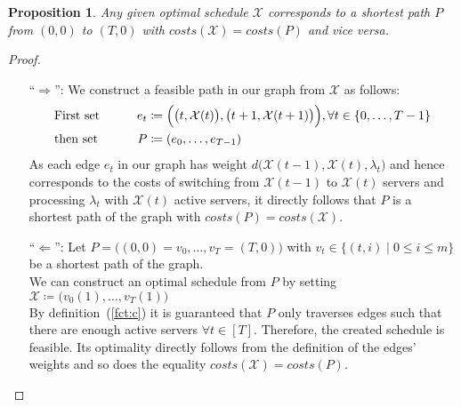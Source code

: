 \documentclass[hidelinks]{article}
\theoremstyle{plain}
\newtheorem{prop}[thm]{Proposition}
\theoremstyle{definition}
\theoremstyle{rem}
\newcommand{\mx}{\mathcal{X}}
\newcommand{\fromto}[2]{\{#1,\ldots,#2\}}
\begin{document}
\begin{sloppypar}
\begin{prop}
	Any given optimal schedule $\mx$ corresponds to a shortest path $P$ from $(0,0)$ to $(T,0)$ with $costs(\mx)=costs(P)$ and vice versa.
\end{prop} 
\begin{proof}
$ $
\begin{itemize}
	\item[``$\Rightarrow$'':] We construct a feasible path in our graph from $\mx$ as follows:
\begin{alignat*}{2}
	&\text{First set}\qquad&e_t&\coloneqq\Bigl(\bigl(t,\mx(t)\bigr),\bigl(t+1,\mx(t+1)\bigr)\Bigr),\forall t\in\fromto{0}{T-1}\\
	&\text{then set}\qquad&P&\coloneqq(e_0,\ldots,e_{T-1})
\end{alignat*}
As each edge $e_t$ in our graph has weight $d\bigl(\mx(t-1),\mx(t),\lambda_{t}\bigr)$ and hence corresponds to the costs of switching from $\mx(t-1)$ to $\mx(t)$ servers and processing $\lambda_{t}$ with $\mx(t)$ active servers, it directly follows that $P$ is a shortest path of the graph with $costs(P)=costs(\mx)$.
	\item[``$\Leftarrow$'':] Let $P=\bigl((0,0)=v_0,\ldots,v_T=(T,0)\bigr)$ with $v_t\in\bigl\{(t,i)\mid 0\le i\le m\bigr\}$ be a shortest path of the graph.\\ 
	We can construct an optimal schedule from $P$ by setting $\mx\coloneqq\bigl(v_0(1),\ldots,v_T(1)\bigr)$\\
	By definition~(\ref{fct:c}) it is guaranteed that $P$ only traverses edges such that there are enough active servers $\forall t\in[T]$. Therefore, the created schedule is feasible. Its optimality directly follows from the definition of the edges' weights and so does the equality $costs(\mx)=costs(P)$.
\end{itemize}
\end{proof}


\end{sloppypar}
\end{document}
